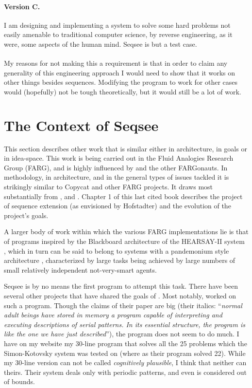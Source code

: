 \documentclass[letterpaper]{article}
\begin{document}
\paragraph{Version C.}  I am designing and implementing a system to solve some hard problems not easily amenable to traditional computer science, by reverse engineering, as it were, some aspects of the human mind.  Seqsee is but a test case.

\paragraph{} My reasons for not making this a requirement is that in order to claim any generality of this engineering approach I would need to show that it works on other things besides sequences.  Modifying the program to work for other cases would (hopefully) not be tough theoretically, but it would still be a lot of work.

\tableofcontents

\section{The Context of Seqsee}
\label{sec:context}

This section describes other work that is similar either in architecture, in goals or in idea-space. This work is being carried out in the Fluid Analogies Research Group (FARG), and is highly influenced by \hof and the other FARGonauts. In methodology, in architecture, and in the general types of issues tackled it is strikingly similar to Copycat and other FARG projects. It draws most substantially from ,  and . Chapter 1 of this last cited book describes the project of sequence extension (as envisioned by Hofstadter) and the evolution of the project's goals.

A larger body of work within which the various FARG implementations lie is that of programs inspired by the Blackboard architecture of the HEARSAY-II system \cite{Reddy}, which in turn can be said to belong to systems with a pandemonium style architecture \cite{Dennett:Consciousness}, characterized by large tasks being achieved by large numbers of small relatively independent not-very-smart agents. 

Seqsee is by no means the first program to attempt this task. There have been several other projects that have shared the  goals of \seq. Most notably,  worked on such a program. Though the claims of their paper are big (their italics: ``\emph{normal adult beings have stored in memory a program capable of interpreting and executing descriptions of serial patterns. In its essential structure, the program is like the one we have just described}''), the program does not seem to do much. I have on my website \cite{Mahabal:simon} my 30-line program that solves all the 25 problems which the Simon-Kotovsky system was tested on (where as their program solved 22). While my 30-line version can not be called \emph{cognitively plausible}, I think that neither can theirs. Their system deals only with periodic patterns, and even  is considered out of bounds.
\end{document}
